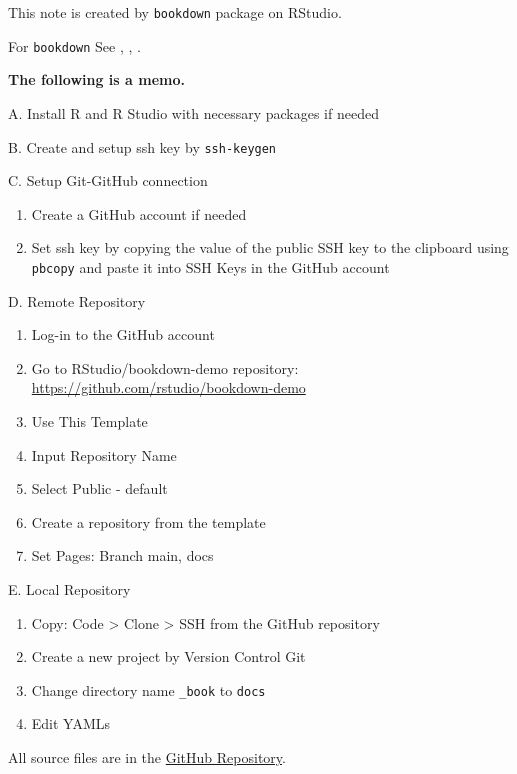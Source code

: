 \documentclass[
]{book}
\providecommand{\tightlist}{%
  \setlength{\itemsep}{0pt}\setlength{\parskip}{0pt}}
\theoremstyle{definition}
\theoremstyle{definition}
\theoremstyle{definition}
\theoremstyle{definition}
\theoremstyle{remark}
\begin{document}
This note is created by \texttt{bookdown} package on RStudio.

For \texttt{bookdown} See \citep{xie2015}, \citep{xie2017}, \citep{xie2018}.

\textbf{The following is a memo.}

A. Install R and R Studio with necessary packages if needed

B. Create and setup ssh key by \texttt{ssh-keygen}

C. Setup Git-GitHub connection

\begin{enumerate}
\def\labelenumi{\arabic{enumi}.}
\tightlist
\item
  Create a GitHub account if needed\\
\item
  Set ssh key by copying the value of the public SSH key to the clipboard using \texttt{pbcopy} and paste it into SSH Keys in the GitHub account
\end{enumerate}

D. Remote Repository

\begin{enumerate}
\def\labelenumi{\arabic{enumi}.}
\tightlist
\item
  Log-in to the GitHub account
\item
  Go to RStudio/bookdown-demo repository: \url{https://github.com/rstudio/bookdown-demo}
\item
  Use This Template
\item
  Input Repository Name
\item
  Select Public - default
\item
  Create a repository from the template
\item
  Set Pages: Branch main, docs
\end{enumerate}

E. Local Repository

\begin{enumerate}
\def\labelenumi{\arabic{enumi}.}
\tightlist
\item
  Copy: Code \textgreater{} Clone \textgreater{} SSH from the GitHub repository
\item
  Create a new project by Version Control Git
\item
  Change directory name \texttt{\_book} to \texttt{docs}
\item
  Edit YAMLs
\end{enumerate}

All source files are in the
\href{https://github.com/icu-hsuzuki/t-algebra}{GitHub Repository}.
\end{document}
